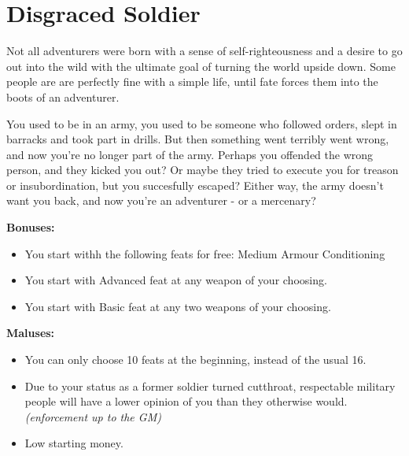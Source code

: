 \section{Disgraced Soldier}
Not all adventurers were born with a sense of self-righteousness and a desire to go out into the wild with the ultimate goal of turning the world upside down. Some people are are perfectly fine with a simple life, until fate forces them into the boots of an adventurer.

You used to be in an army, you used to be someone who followed orders, slept in barracks and took part in drills. But then something went terribly went wrong, and now you're no longer part of the army. Perhaps you offended the wrong person, and they kicked you out? Or maybe they tried to execute you for treason or insubordination, but you succesfully escaped? Either way, the army doesn't want you back, and now you're an adventurer - or a mercenary? 


\textbf{Bonuses:}
\begin{itemize}
	\item You start withh the following feats for free: Medium Armour Conditioning
	\item You start with Advanced feat at any weapon of your choosing.
	\item You start with Basic feat at any two weapons of your choosing.
\end{itemize}


\textbf{Maluses:}
\begin{itemize}
	\item You can only choose 10 feats at the beginning, instead of the usual 16.
	\item Due to your status as a former soldier turned cutthroat, respectable military people will have a lower opinion of you than they otherwise would. \textit{(enforcement up to the GM)}
	\item Low starting money.
\end{itemize}
